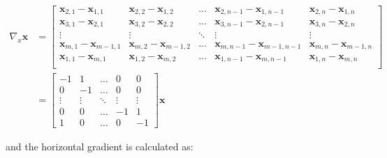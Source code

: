 \documentclass[12pt]{article}
\begin{document}
\begin{equation}
  \begin{aligned}
  \nabla_{x} \mathbf{x} &= \begin{bmatrix}
    \mathbf{x}_{2,1} - \mathbf{x}_{1,1} & \mathbf{x}_{2, 2} - \mathbf{x}_{1, 2} & \ldots & \mathbf{x}_{2, n-1} - \mathbf{x}_{1, n-1} & \mathbf{x}_{2, n} - \mathbf{x}_{1, n} \\
    \mathbf{x}_{3,1} - \mathbf{x}_{2,1} & \mathbf{x}_{3, 2} - \mathbf{x}_{2, 2} & \ldots & \mathbf{x}_{3, n-1} - \mathbf{x}_{2, n-1} & \mathbf{x}_{3, n} - \mathbf{x}_{2, n}  \\
    \vdots & \vdots & \ddots & \vdots & \vdots \\
    \mathbf{x}_{m,1} - \mathbf{x}_{m-1,1} & \mathbf{x}_{m, 2} - \mathbf{x}_{m-1, 2} & \ldots & \mathbf{x}_{m, n-1} - \mathbf{x}_{m-1, n-1} & \mathbf{x}_{m, n} - \mathbf{x}_{m-1, n} \\
    \mathbf{x}_{1, 1} - \mathbf{x}_{m, 1} & \mathbf{x}_{1, 2} - \mathbf{x}_{m, 2} & \ldots & \mathbf{x}_{1, n-1} - \mathbf{x}_{m, n-1} & \mathbf{x}_{1, n} - \mathbf{x}_{m, n} \\
  \end{bmatrix} \\
  &= \begin{bmatrix}
    -1 & 1 & \ldots & 0 & 0 \\
    0 & -1 & \ldots & 0 & 0 \\
     \vdots & \vdots & \ddots & \vdots & \vdots \\
    0 & 0 & \ldots & -1 & 1 \\
    1 & 0 & \ldots & 0 & -1
    \end{bmatrix} \mathbf{x}
  \end{aligned}
\end{equation}

and the horizontal gradient is calculated as:
\end{document}
